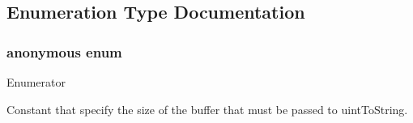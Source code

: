 \subsection{Enumeration Type Documentation}
\hypertarget{namespace_json_a2aacab54ef6fc18e833fbd4982a0a23a}{}\subsubsection[{anonymous enum}]{\setlength{\rightskip}{0pt plus 5cm}anonymous enum}\label{namespace_json_a2aacab54ef6fc18e833fbd4982a0a23a}
\begin{Desc}
\item[Enumerator]\par
\begin{description}
\item[{\em 
\hypertarget{namespace_json_a2aacab54ef6fc18e833fbd4982a0a23aae4f2008c7919f20d81286121d1374424}{}uint\+To\+String\+Buffer\+Size\label{namespace_json_a2aacab54ef6fc18e833fbd4982a0a23aae4f2008c7919f20d81286121d1374424}
}]Constant that specify the size of the buffer that must be passed to uint\+To\+String. \end{description}
\end{Desc}
\hypertarget{namespace_json_a4fc417c23905b2ae9e2c47d197a45351}{}
